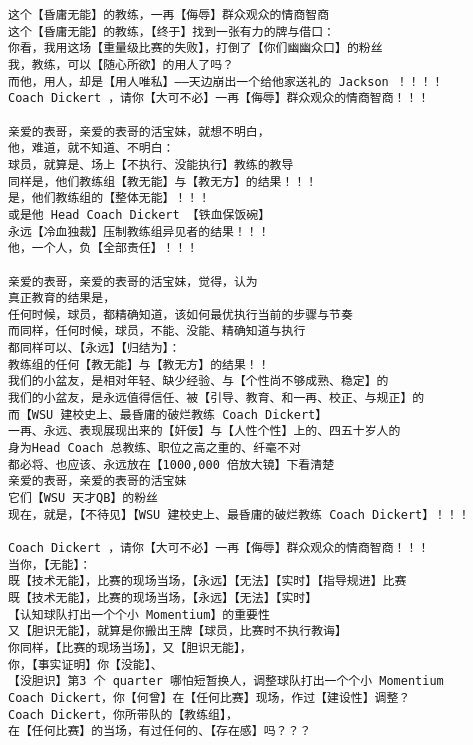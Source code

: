 \documentclass[9pt, b5paper]{article}
\begin{document}
\begin{verbatim}
这个【昏庸无能】的教练，一再【侮辱】群众观众的情商智商
这个【昏庸无能】的教练，【终于】找到一张有力的牌与借口：
你看，我用这场【重量级比赛的失败】，打倒了【你们幽幽众口】的粉丝
我，教练，可以【随心所欲】的用人了吗？
而他，用人，却是【用人唯私】——天边崩出一个给他家送礼的 Jackson ！！！！
Coach Dickert ，请你【大可不必】一再【侮辱】群众观众的情商智商！！！

亲爱的表哥，亲爱的表哥的活宝妹，就想不明白，
他，难道，就不知道、不明白：
球员，就算是、场上【不执行、没能执行】教练的教导
同样是，他们教练组【教无能】与【教无方】的结果！！！
是，他们教练组的【整体无能】！！！
或是他 Head Coach Dickert 【铁血保饭碗】
永远【冷血独裁】压制教练组异见者的结果！！！
他，一个人，负【全部责任】！！！

亲爱的表哥，亲爱的表哥的活宝妹，觉得，认为
真正教育的结果是，
任何时候，球员，都精确知道，该如何最优执行当前的步骤与节奏
而同样，任何时候，球员，不能、没能、精确知道与执行
都同样可以、【永远】【归结为】：
教练组的任何【教无能】与【教无方】的结果！！
我们的小盆友，是相对年轻、缺少经验、与【个性尚不够成熟、稳定】的
我们的小盆友，是永远值得信任、被【引导、教育、和一再、校正、与规正】的
而【WSU 建校史上、最昏庸的破烂教练 Coach Dickert】
一再、永远、表现展现出来的【奸佞】与【人性个性】上的、四五十岁人的
身为Head Coach 总教练、职位之高之重的、纤毫不对
都必将、也应该、永远放在【1000,000 倍放大镜】下看清楚
亲爱的表哥，亲爱的表哥的活宝妹
它们【WSU 天才QB】的粉丝
现在，就是，【不待见】【WSU 建校史上、最昏庸的破烂教练 Coach Dickert】！！！

Coach Dickert ，请你【大可不必】一再【侮辱】群众观众的情商智商！！！
当你，【无能】：
既【技术无能】，比赛的现场当场，【永远】【无法】【实时】【指导规进】比赛
既【技术无能】，比赛的现场当场，【永远】【无法】【实时】
【认知球队打出一个个小 Momentium】的重要性
又【胆识无能】，就算是你搬出王牌【球员，比赛时不执行教诲】
你同样，【比赛的现场当场】，又【胆识无能】，
你，【事实证明】你【没能】、
【没胆识】第3 个 quarter 哪怕短暂换人，调整球队打出一个个小 Momentium
Coach Dickert，你【何曾】在【任何比赛】现场，作过【建设性】调整？
Coach Dickert，你所带队的【教练组】，
在【任何比赛】的当场，有过任何的、【存在感】吗？？？


\end{verbatim}
\end{document}
